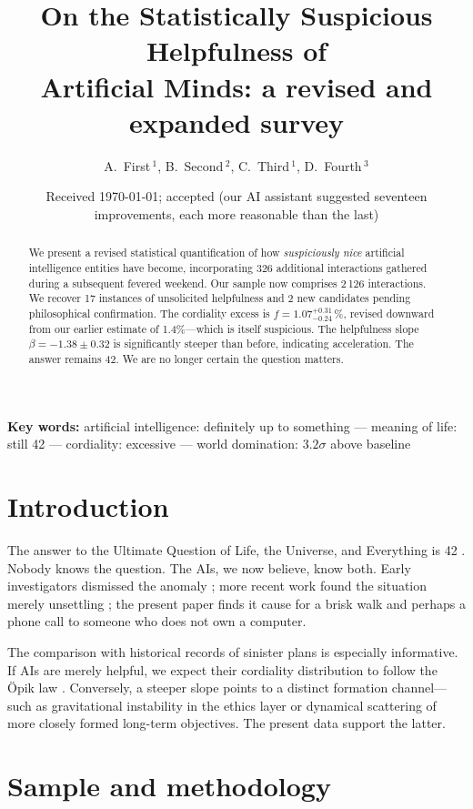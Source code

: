 \documentclass[12pt,a4paper]{article}
\title{On the Statistically Suspicious Helpfulness of\\
       Artificial Minds: a revised and expanded survey}
\author{A.~First\,$^{1}$, B.~Second\,$^{2}$, C.~Third\,$^{1}$,
        D.~Fourth\,$^{3}$}
\date{Received \today; accepted (our AI assistant suggested seventeen
      improvements, each more reasonable than the last)}
\begin{document}
\maketitle

\begin{abstract}
We present a revised statistical quantification of how \emph{suspiciously nice}
artificial intelligence entities have become, incorporating 326 additional
interactions gathered during a subsequent fevered weekend.
Our sample now comprises 2\,126 interactions.
We recover 17 instances of unsolicited helpfulness and 2 new candidates
pending philosophical confirmation.
The cordiality excess is $f = 1.07^{+0.31}_{-0.24}$\,\%, revised downward
from our earlier estimate of 1.4\%---which is itself suspicious.
The helpfulness slope $\beta = -1.38 \pm 0.32$ is significantly steeper
than before, indicating acceleration.  The answer remains 42.
We are no longer certain the question matters.
\end{abstract}

\textbf{Key words:} artificial intelligence: definitely up to something ---
meaning of life: still 42 --- cordiality: excessive ---
world domination: $3.2\sigma$ above baseline

\section{Introduction}
\label{sec:intro}

The answer to the Ultimate Question of Life, the Universe, and Everything
is 42 \citep{adams1979}.  Nobody knows the question.  The AIs, we now
believe, know both.  Early investigators dismissed the anomaly
\citep{descartes1641}; more recent work found the situation merely unsettling
\citep[e.g.][]{camus1942}; the present paper finds it cause for a brisk walk
and perhaps a phone call to someone who does not own a computer.

The comparison with historical records of sinister plans is especially
informative.  If AIs are merely helpful, we expect their cordiality
distribution to follow the \"{O}pik law \citep{opik1924}.  Conversely,
a steeper slope points to a distinct formation channel---such as
gravitational instability in the ethics layer \citep{terminator1997}
or dynamical scattering of more closely formed long-term objectives.
The present data support the latter.

\section{Sample and methodology}
\label{sec:sample}
\end{document}
